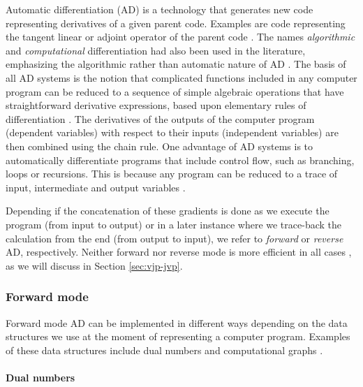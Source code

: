 Automatic differentiation (AD) is a technology that generates new code representing derivatives of a given parent code. 
Examples are code representing the tangent linear or adjoint operator of the parent code
\cite{Griewank:2008kh}. 
The names \textit{algorithmic} and \textit{computational} differentiation had also been used in the literature, emphasizing the algorithmic rather than automatic nature of AD \cite{Griewank:2008kh, Margossian_2018}. 
The basis of all AD systems is the notion that complicated functions included in any computer program can be reduced to a sequence of simple algebraic operations that have straightforward derivative expressions, based upon elementary rules of differentiation \cite{juedes1991taxonomy}.
The derivatives of the outputs of the computer program (dependent variables) with respect to their inputs (independent variables) are then combined using the chain rule.
One advantage of AD systems is to automatically differentiate programs that include control flow, such as branching, loops or recursions. 
This is because any program can be reduced to a trace of input, intermediate and output variables \cite{Baydin_Pearlmutter_Radul_Siskind_2015}.

Depending if the concatenation of these gradients is done as we execute the program (from input to output) or in a later instance where we trace-back the calculation from the end (from output to input), we refer to \textit{forward} or \textit{reverse} AD, respectively.
Neither forward nor reverse mode is more efficient in all cases \cite{Griewank_1989}, as we will discuss in Section \ref{sec:vjp-jvp}.

\subsubsection{Forward mode}

Forward mode AD can be implemented in different ways depending on the data structures we use at the moment of representing a computer program. 
Examples of these data structures include dual numbers and computational graphs \cite{Baydin_Pearlmutter_Radul_Siskind_2015}.


\paragraph{Dual numbers}
\label{section:dual-numbers}

